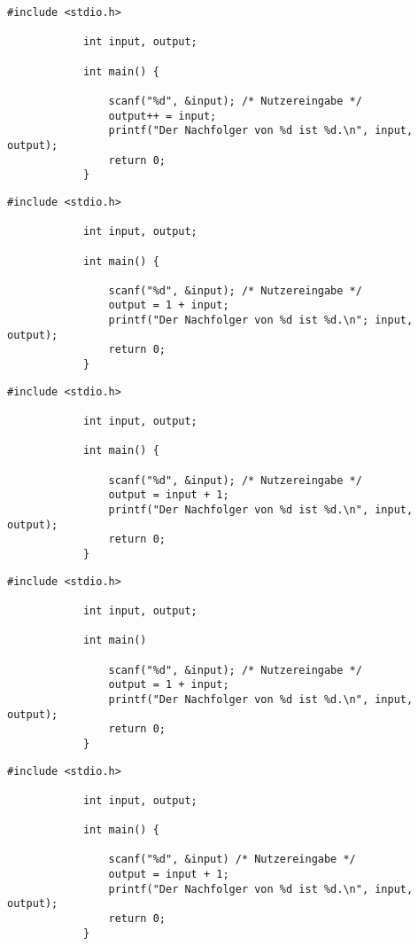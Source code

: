 \documentclass[]{article}
\begin{document}
	\begin{minipage}{0.5\linewidth} %
		\begin{lstlisting}[gobble=6]
			#include <stdio.h>
			
			int input, output;
			
			int main() {
			
				scanf("%d", &input); /* Nutzereingabe */
				output++ = input;
				printf("Der Nachfolger von %d ist %d.\n", input, output);
				return 0;
			}
		\end{lstlisting}
	\end{minipage}
	\quad
	\begin{minipage}{0.5\linewidth} %
		\begin{lstlisting}[gobble=6]
			#include <stdio.h>
			
			int input, output;
			
			int main() {
			
				scanf("%d", &input); /* Nutzereingabe */
				output = 1 + input;
				printf("Der Nachfolger von %d ist %d.\n"; input, output);
				return 0;
			}
		\end{lstlisting}
	\end{minipage}
	\begin{minipage}{0.5\linewidth} %
		\begin{lstlisting}[gobble=6]
			#include <stdio.h>
			
			int input, output;
			
			int main() {
			
				scanf("%d", &input); /* Nutzereingabe */
				output = input + 1;
				printf("Der Nachfolger von %d ist %d.\n", input, output);
				return 0;
			}
		\end{lstlisting}
	\end{minipage}
	\quad
	\begin{minipage}{0.5\linewidth} %
		\begin{lstlisting}[gobble=6]
			#include <stdio.h>
			
			int input, output;
			
			int main() 
			
				scanf("%d", &input); /* Nutzereingabe */
				output = 1 + input;
				printf("Der Nachfolger von %d ist %d.\n", input, output);
				return 0;
			}
		\end{lstlisting}
	\end{minipage}
	\begin{minipage}{0.5\linewidth} %
		\begin{lstlisting}[gobble=6]
			#include <stdio.h>
			
			int input, output;
			
			int main() {
			
				scanf("%d", &input) /* Nutzereingabe */
				output = input + 1;
				printf("Der Nachfolger von %d ist %d.\n", input, output);
				return 0;
			}
		\end{lstlisting}
	\end{minipage}
\end{document}
